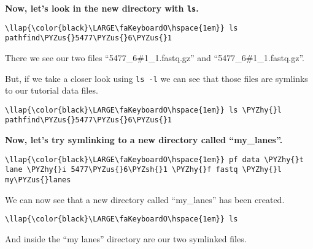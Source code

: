 \documentclass[11pt]{article}
\def\PYZus{\char`\_}
\def\PYZsh{\char`\#}
\def\PYZhy{\char`\-}
\begin{document}
\textbf{Now, let's look in the new directory with \texttt{ls}.}

\begin{terminalinput}
\begin{Verbatim}[commandchars=\\\{\}]
\llap{\color{black}\LARGE\faKeyboardO\hspace{1em}} ls pathfind\PYZus{}5477\PYZus{}6\PYZus{}1
\end{Verbatim}
\end{terminalinput}

    There we see our two files ``5477\_6\#1\_1.fastq.gz'' and
``5477\_6\#1\_1.fastq.gz''.

But, if we take a closer look using \texttt{ls\ -l} we can see that
those files are symlinks to our tutorial data files.

\begin{terminalinput}
\begin{Verbatim}[commandchars=\\\{\}]
\llap{\color{black}\LARGE\faKeyboardO\hspace{1em}} ls \PYZhy{}l pathfind\PYZus{}5477\PYZus{}6\PYZus{}1
\end{Verbatim}
\end{terminalinput}

    \textbf{Now, let's try symlinking to a new directory called
``my\_lanes''.}

\begin{terminalinput}
\begin{Verbatim}[commandchars=\\\{\}]
\llap{\color{black}\LARGE\faKeyboardO\hspace{1em}} pf data \PYZhy{}t lane \PYZhy{}i 5477\PYZus{}6\PYZsh{}1 \PYZhy{}f fastq \PYZhy{}l my\PYZus{}lanes
\end{Verbatim}
\end{terminalinput}

    We can now see that a new directory called ``my\_lanes'' has been
created.

\begin{terminalinput}
\begin{Verbatim}[commandchars=\\\{\}]
\llap{\color{black}\LARGE\faKeyboardO\hspace{1em}} ls
\end{Verbatim}
\end{terminalinput}

    And inside the ``my lanes'' directory are our two symlinked files.
\end{document}

